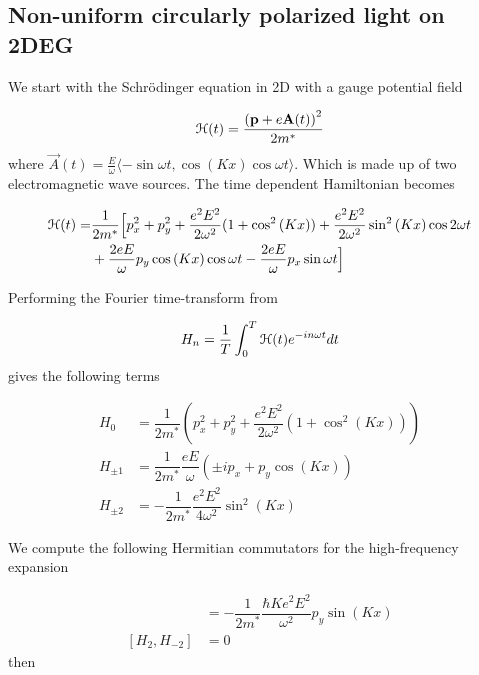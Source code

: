 \subsection{Non-uniform circularly polarized light on 2DEG} \label{fll-2deg-derivation}

We start with the Schr\"{o}dinger equation in 2D with a gauge potential field

\begin{equation}
  \mathcal{H}(t) = \dfrac{\left(\mathbf{p} + e\mathbf{A}(t) \right)^2}{2m^*}
\end{equation}
where $\vec{A}(t) = \tfrac{E}{\omega} \langle -\sin{\omega t} , \cos{(Kx)}\cos{\omega t} \rangle$.
Which is made up of two electromagnetic wave sources.
The time dependent Hamiltonian becomes

\begin{equation}
\begin{split}
  \mathcal{H}(t) = &\dfrac{1}{2m^*} \Big[ p_x^2 + p_y^2 + \dfrac{e^2 E^2}{2\omega^2}(1+\cos^2{(Kx)}) + \dfrac{e^2 E^2}{2\omega^2}\sin^2{(Kx)} \cos{2\omega t} \\
  &+ \dfrac{2eE}{\omega} p_y \cos{(Kx)} \cos{\omega t} - \dfrac{2eE}{\omega} p_x \sin{\omega t} \Big]
\end{split}
\end{equation}

Performing the Fourier time-transform from

\begin{equation}
  H_n = \dfrac{1}{T} \int_{0}^{T} \mathcal{H}(t) e^{-in\omega t} dt
\end{equation}
gives the following terms

\begin{align}
  H_0 &= \dfrac{1}{2m^*} \left( p_x^2 + p_y^2 + \dfrac{e^2 E^2}{2 \omega^2} (1+\cos^2{(Kx)}) \right) \\
  H_{\pm1} &= \dfrac{1}{2m^*} \dfrac{eE}{\omega}\left( \pm i p_x + p_y \cos{(Kx)} \right) \\
  H_{\pm2} &= -\dfrac{1}{2m^*} \dfrac{e^2 E^2}{4\omega^2} \sin^2{(Kx)}
\end{align}

We compute the following Hermitian commutators for the high-frequency expansion

\begin{align}
  [H_{1}, H_{-1}] &= -\dfrac{1}{2m^*} \dfrac{\hbar K e^2 E^2}{\omega^2} p_y \sin{(Kx)} \\
  [H_{2}, H_{-2}] &= 0
\end{align}
then

